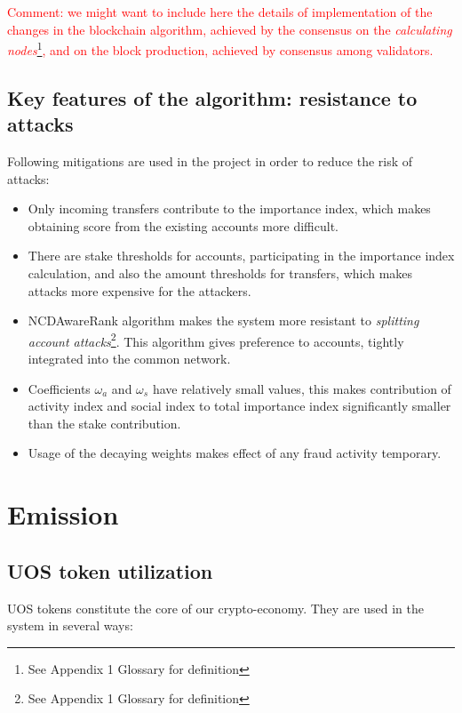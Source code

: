 \documentclass[a4paper,12pt]{article}
\begin{document}
\textcolor{red}{Comment: we might want to include here the details of implementation of the changes in the blockchain algorithm, achieved by the consensus on the \emph{calculating nodes}\footnote{See Appendix 1 Glossary for definition}, and on the block production, achieved by consensus among validators.}


\subsection{Key features of the algorithm: resistance to attacks}

Following mitigations are used in the project in order to reduce the risk of attacks:

\begin{itemize}
  \item Only incoming transfers contribute to the importance index, which makes obtaining score from the existing accounts more difficult.
  \item There are stake thresholds for accounts, participating in the importance index calculation, and also the amount thresholds for transfers, which makes attacks more expensive for the attackers.
  \item NCDAwareRank algorithm makes the system more resistant to \emph{splitting account attacks}\footnote{See Appendix 1 Glossary for definition}. This algorithm gives preference to accounts, tightly integrated into the common network.
  \item Coefficients $\omega_a$ and $\omega_s$ have relatively small values, this makes contribution of activity index and social index to total importance index significantly smaller than the stake contribution.
  \item Usage of the decaying weights makes effect of any fraud activity temporary. 
\end{itemize}


\section{Emission}

\subsection{U{\degree}OS token utilization}

U{\degree}OS tokens constitute the core of our crypto-economy. They are used in the system in several ways:
\end{document}
